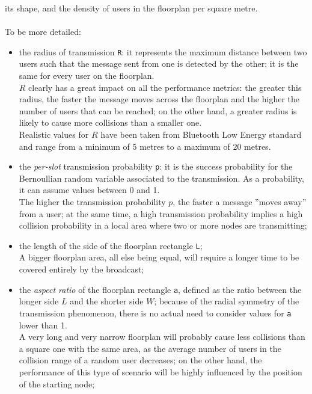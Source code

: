 its shape, and the density of users in the floorplan per square metre.\\
\\
To be more detailed:
\begin{itemize}
	\item the radius of transmission \colorbox{gray!30}{\large \texttt{R}}: it
	represents the maximum distance between two users such that the message
	sent from one is detected by the other; it is the same for every user on
	the floorplan.\\
	$R$ clearly has a great impact on all
    the performance metrics: the greater this radius, the faster the message
    moves across the floorplan and the higher the number of users that can be
    reached; on the other hand, a greater radius is likely to cause more
    collisions than a smaller one. \\
	 Realistic values for $R$ have been taken from Bluetooth Low
	Energy standard and range from a minimum of $5$ metres to a maximum of $20$
	metres.
	\item the \textit{per-slot} transmission probability
	\colorbox{gray!30}{\large \texttt{p}}: it is the success probability for the
	Bernoullian random variable associated to the transmission. As a
	probability, it can assume values between 0 and 1.\\
	The higher the transmission probability $p$, the faster a message ”moves away” from
a user; at the same time, a high transmission probability implies a high collision
probability in a local area where two or more nodes are transmitting;
    \item the length of the side of the floorplan rectangle
    \colorbox{gray!30}{\large \texttt{L}}; \\
    A bigger floorplan area, all else being equal, will require a longer
    time to be covered entirely by the broadcast;
	\item the \textit{aspect ratio} of the floorplan rectangle
	\colorbox{gray!30}{\large \texttt{a}}, defined as the ratio between the
	longer side $L$ and the shorter side $W$; because of the radial symmetry of
	the transmission phenomenon, there is no actual need to consider values for
	\texttt{a} lower than 1.\\
	A very long and very narrow floorplan will probably cause less collisions than a
square one with the same area, as the average number of users in the collision
range of a random user decreases; on the other hand, the performance of this type of
scenario will be highly influenced by the position of the starting node;


\end{itemize}
